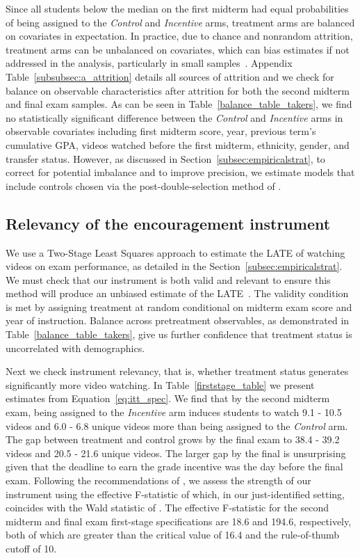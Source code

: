 \documentclass[12pt]{article}
\begin{document}
Since all students below the median on the first midterm had equal probabilities of being assigned to the \textit{Control} and \textit{Incentive} arms, treatment arms are balanced on covariates in expectation.
In practice, due to chance and nonrandom attrition, treatment arms can be unbalanced on covariates, which can bias estimates if not addressed in the analysis, particularly in small samples~\parencite{ai2017}.
Appendix Table~\ref{subsubsec:a_attrition} details all sources of attrition and we check for balance on observable characteristics after attrition for both the second midterm and final exam samples.
As can be seen in Table~\ref{balance_table_takers}, we find no statistically significant difference between the \textit{Control} and \textit{Incentive} arms in observable covariates including first midterm score, year, previous term's cumulative GPA, videos watched before the first midterm, ethnicity, gender, and transfer status.
However, as discussed in Section~\ref{subsec:empiricalstrat}, to correct for potential imbalance and to improve precision, we estimate models that include controls chosen via the post-double-selection method of \textcite{bch2014a}.

\subsection{Relevancy of the encouragement instrument}\label{subsec:relevancy}

We use a Two-Stage Least Squares approach to estimate the LATE of watching videos on exam performance, as detailed in the Section~\ref{subsec:empiricalstrat}.
We must check that our instrument is both valid and relevant to ensure this method will produce an unbiased estimate of the LATE~\parencite{ir2015}.
The validity condition is met by assigning treatment at random conditional on midterm exam score and year of instruction.
Balance across pretreatment observables, as demonstrated in Table~\ref{balance_table_takers}, give us further confidence that treatment status is uncorrelated with demographics.

Next we check instrument relevancy, that is, whether treatment status generates significantly more video watching.
In Table~\ref{firststage_table} we present estimates from Equation~\ref{eq:itt_spec}.
We find that by the second midterm exam, being assigned to the \textit{Incentive} arm induces students to watch 9.1 - 10.5 videos and 6.0 - 6.8 unique videos more than being assigned to the \textit{Control} arm.
The gap between treatment and control grows by the final exam to 38.4 - 39.2 videos and 20.5 - 21.6 unique videos.
The larger gap by the final is unsurprising given that the deadline to earn the grade incentive was the day before the final exam.
Following the recommendations of \textcite{ass2019}, we assess the strength of our instrument using the effective F-statistic of \textcite{op2013} which, in our just-identified setting, coincides with the Wald statistic of \textcite{kp2006}.
The effective F-statistic for the second midterm and final exam first-stage specifications are 18.6 and 194.6, respectively, both of which are greater than the \textcite{sy2005} critical value of 16.4 and the rule-of-thumb cutoff of 10.
\end{document}

